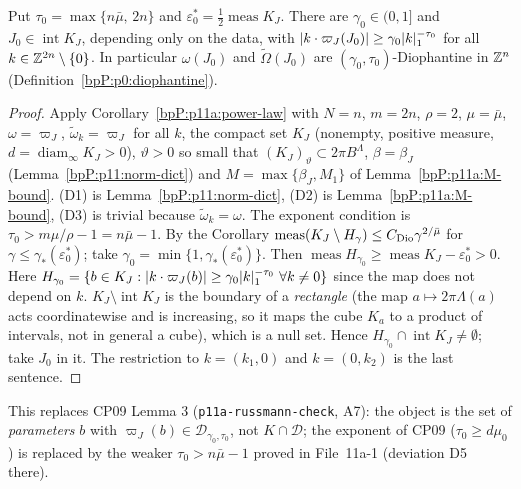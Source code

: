 \begin{lemma}\label{bpP:p11:select}
Put $\tau_0=\max\{n\bar\mu,\,2n\}$ and $\varepsilon_0^*=\tfrac12\operatorname{meas}K_J$. There are $\gamma_0\in(0,1]$ and $J_0\in\operatorname{int}K_J$, depending only on the data, with $\lvert k\cdot\varpi_J(J_0)\rvert\ge\gamma_0\lvert k\rvert_1^{-\tau_0}$ for all $k\in\mathbb{Z}^{2n}\setminus\{0\}$. In particular $\omega(J_0)$ and $\tilde\Omega(J_0)$ are $(\gamma_0,\tau_0)$-Diophantine in $\mathbb{Z}^n$ (Definition~\ref{bpP:p0:diophantine}).
\end{lemma}
\begin{proof}
\label{stepP:p11:sel-hyp} Apply Corollary~\ref{bpP:p11a:power-law} with $N=n$, $m=2n$, $\rho=2$, $\mu=\bar\mu$, $\omega=\varpi_J$, $\tilde\omega_k=\varpi_J$ for all $k$, the compact set $K_J$ (nonempty, positive measure, $d=\operatorname{diam}_\infty K_J>0$), $\vartheta>0$ so small that $(K_J)_\vartheta\subset 2\pi B^\Lambda$, $\beta=\beta_J$ (Lemma~\ref{bpP:p11:norm-dict}) and $M=\max\{\beta_J,M_1\}$ of Lemma~\ref{bpP:p11a:M-bound}. (D1) is Lemma~\ref{bpP:p11:norm-dict}, (D2) is Lemma~\ref{bpP:p11a:M-bound}, (D3) is trivial because $\tilde\omega_k=\omega$. The exponent condition is $\tau_0>m\mu/\rho-1=n\bar\mu-1$.
\label{stepP:p11:sel-gam} By the Corollary $\operatorname{meas}(K_J\setminus H_\gamma)\le C_{\rm Dio}\gamma^{2/\bar\mu}$ for $\gamma\le\gamma_*(\varepsilon^*_0)$; take $\gamma_0=\min\{1,\gamma_*(\varepsilon_0^*)\}$. Then $\operatorname{meas}H_{\gamma_0}\ge\operatorname{meas}K_J-\varepsilon_0^*>0$. Here $H_{\gamma_0}=\{b\in K_J:\lvert k\cdot\varpi_J(b)\rvert\ge\gamma_0\lvert k\rvert_1^{-\tau_0}\ \forall k\ne0\}$ since the map does not depend on $k$.
\label{stepP:p11:sel-int} $K_J\setminus\operatorname{int}K_J$ is the boundary of a \emph{rectangle} (the map $a\mapsto2\pi\Lambda(a)$ acts coordinatewise and is increasing, so it maps the cube $K_a$ to a product of intervals, not in general a cube), which is a null set. Hence $H_{\gamma_0}\cap\operatorname{int}K_J\neq\emptyset$; take $J_0$ in it. The restriction to $k=(k_1,0)$ and $k=(0,k_2)$ is the last sentence.
\end{proof}
This replaces CP09 Lemma 3 (\texttt{p11a-russmann-check}, A7): the object is the set of \emph{parameters} $b$ with $\varpi_J(b)\in\mathcal D_{\gamma_0,\tau_0}$, not $K\cap\mathcal D$; the exponent of CP09 ($\tau_0\ge d\mu_0$) is replaced by the weaker $\tau_0>n\bar\mu-1$ proved in File~11a-1 (deviation D5 there).

